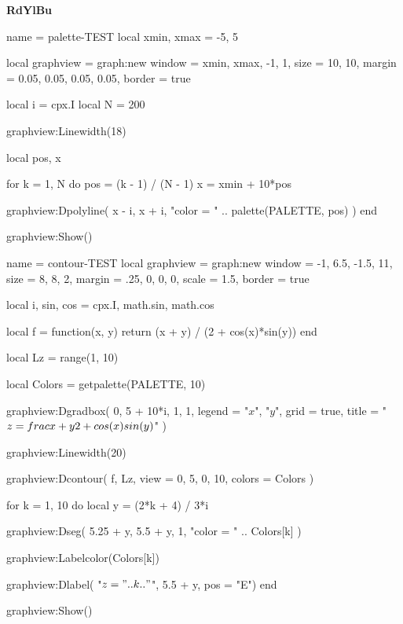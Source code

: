 \documentclass{scrartcl}
\newcommand\MYPALETTE{RdYlBu}
\begin{document}


\directlua{PALETTE = pal\MYPALETTE}




\centering

\null\hfill{\bfseries\Huge\MYPALETTE}\hfill\null


\bigskip


\begin{luadraw}{name = palette-TEST}
local xmin, xmax = -5, 5

local graphview = graph:new{
  window = {xmin, xmax, -1, 1},
  size   = {10, 10},
  margin = {0.05, 0.05, 0.05, 0.05},
  border = true
}

local i = cpx.I
local N = 200

graphview:Linewidth(18)

local pos, x

for k = 1, N do
  pos = (k - 1) / (N - 1)
  x   = xmin + 10*pos

  graphview:Dpolyline(
    {x - i, x + i},
    "color = " .. palette(PALETTE, pos)
  )
end

graphview:Show()
\end{luadraw}


\bigskip


\begin{luadraw}{name = contour-TEST}
local graphview = graph:new{
  window = {-1, 6.5, -1.5, 11},
  size   = {8, 8, 2},
  margin = {.25, 0, 0, 0},
  scale  = 1.5,
  border = true
}

local i, sin, cos = cpx.I, math.sin, math.cos

local f = function(x, y) return (x + y) / (2 + cos(x)*sin(y)) end

local Lz = range(1, 10)

local Colors = getpalette(PALETTE, 10)

graphview:Dgradbox(
  {0, 5 + 10*i, 1, 1},
  {
    legend = {"$x$", "$y$"},
    grid   = true,
    title  = "$z = \\frac{x + y}{2 + \\cos(x) \\sin(y)}$"
  })

graphview:Linewidth(20)

graphview:Dcontour(
  f,
  Lz,
  {
    view   = {0, 5, 0, 10},
    colors = Colors
  })

for k = 1, 10 do
  local y = (2*k + 4) / 3*i

  graphview:Dseg(
    {5.25 + y, 5.5 + y},
    1,
    "color = " .. Colors[k]
  )

  graphview:Labelcolor(Colors[k])

  graphview:Dlabel(
    "$z = " .. k .. "$",
    5.5 + y,
    {pos = "E"})
end

graphview:Show()
\end{luadraw}
\end{document}
